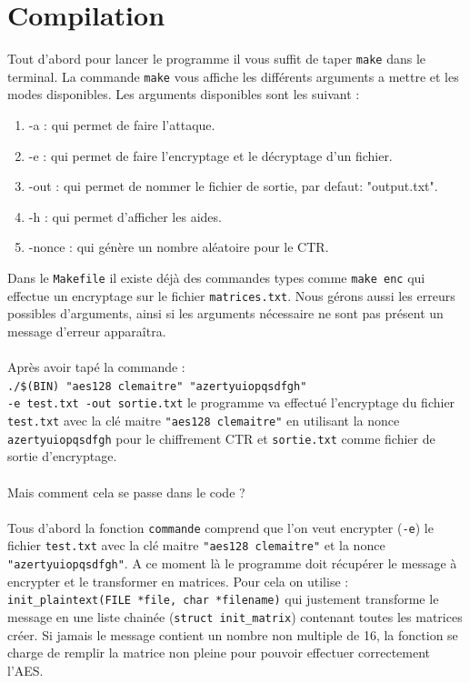 \documentclass[10pt, a4paper]{report}
\begin{document}
	\chapter{Compilation}
	Tout d'abord pour lancer le programme il vous suffit de taper \verb|make| dans le terminal. La commande \verb|make| vous affiche les différents arguments a mettre et les modes disponibles. Les arguments disponibles sont les suivant :
	\begin{enumerate}
		\item -a : qui permet de faire l'attaque.
		\item -e : qui permet de faire l'encryptage et le décryptage d'un fichier.
		\item -out : qui permet de nommer le fichier de sortie, par defaut: "output.txt".
		\item -h : qui permet d'afficher les aides.
		\item -nonce : qui génère un nombre aléatoire pour le CTR.
	\end{enumerate}
	Dans le \verb|Makefile| il existe déjà des commandes types comme \verb|make enc| qui effectue un encryptage sur le fichier \verb|matrices.txt|.
	Nous gérons aussi les erreurs possibles d'arguments, ainsi si les arguments nécessaire ne sont pas présent un message d'erreur apparaîtra.
	\\\\
	Après avoir tapé la commande : \\
	\verb|./$(BIN) "aes128 clemaitre" "azertyuiopqsdfgh"|\\
	\verb|-e test.txt -out sortie.txt|
	le programme va effectué l'encryptage du fichier \verb|test.txt| avec la clé maitre \verb|"aes128 clemaitre"| en utilisant la nonce \verb|azertyuiopqsdfgh| pour le chiffrement CTR et \verb|sortie.txt| comme fichier de sortie d'encryptage.
	\\\\
	Mais comment cela se passe dans le code ?
	\\\\
	Tous d'abord la fonction \verb|commande| comprend que l'on veut encrypter (\verb|-e|) le fichier \verb|test.txt| avec la clé maitre \verb|"aes128 clemaitre"| et la nonce \verb|"azertyuiopqsdfgh"|. A ce moment là le programme doit récupérer le message à encrypter et le transformer en matrices. Pour cela on utilise : \verb|init_plaintext(FILE *file, char *filename)| qui justement transforme le message en une liste chainée (\verb|struct init_matrix|) contenant toutes les matrices créer. Si jamais le message contient un nombre non multiple de 16, la fonction se charge de remplir la matrice non pleine pour pouvoir effectuer correctement l'AES.
\end{document}
